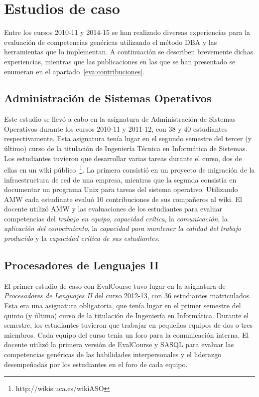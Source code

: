 \section{Estudios de caso}

	Entre los cursos 2010-11 y 2014-15 se han realizado diversas experiencias para la evaluación de competencias genéricas utilizando el método DBA y las herramientas que lo implementan. A continuación se describen brevemente dichas experiencias, mientras que las publicaciones en las que se han presentado se enumeran en el apartado~\ref{eva:contribuciones}.

	\subsection{Administración de Sistemas Operativos}

		Este estudio se llevó a cabo en la asignatura de Administración de Sistemas Operativos durante los cursos 2010-11 y 2011-12, con 38 y 40 estudiantes respectivamente. Esta asignatura tenía lugar en el segundo semestre del tercer (y último) curso de la titulación de Ingeniería Técnica en Informática de Sistemas. Los estudiantes tuvieron que desarrollar varias tareas durante el curso, dos de ellas en un wiki público~\footnote{http://wikis.uca.es/wikiASO}. La primera consistió en un proyecto de migración de la infraestructura de red de una empresa, mientras que la segunda consistía en documentar un programa Unix para tareas del sistema operativo. Utilizando AMW cada estudiante evaluó 10 contribuciones de sus compañeros al wiki. El docente utilizó AMW y las evaluaciones de los estudiantes para evaluar competencias del \emph{trabajo en equipo}, \emph{capacidad crítica}, la \emph{comunicación}, la \emph{aplicación del conocimiento}, la \emph{capacidad para mantener la calidad del trabajo producido} y la \emph{capacidad crítica de sus estudiantes}.

	\subsection{Procesadores de Lenguajes II}

		El primer estudio de caso con EvalCourse tuvo lugar en la asignatura de \emph{Procesadores de Lenguajes II} del curso 2012-13, con 36 estudiantes matriculados. Esta era una asignatura obligatoria, que tenía lugar en el primer semestre del quinto (y último) curso de la titulación de Ingeniería en Informática. Durante el semestre, los estudiantes tuvieron que trabajar en pequeños equipos de dos o tres miembros. Cada equipo del curso tenía un foro para la comunicación interna. El docente utilizó la primera versión de EvalCourse y SASQL para evaluar las competencias genéricas de las habilidades interpersonales y el liderazgo desempeñadas por los estudiantes en el foro de cada equipo. 

